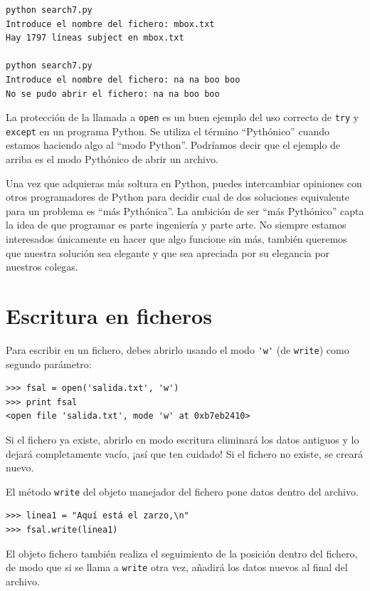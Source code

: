 \beforeverb
\begin{verbatim}
python search7.py
Introduce el nombre del fichero: mbox.txt
Hay 1797 líneas subject en mbox.txt

python search7.py
Introduce el nombre del fichero: na na boo boo
No se pudo abrir el fichero: na na boo boo
\end{verbatim}
\afterverb
%
La protección de la llamada a {\tt open} es un buen ejemplo
del uso correcto de {\tt try}
y {\tt except} en un programa Python. Se utiliza el término
``Pythónico'' cuando estamos haciendo algo al ``modo
Python''. Podríamos decir que el ejemplo de arriba es
el modo Pythónico de abrir un archivo.

Una vez que adquieras más soltura en Python, puedes intercambiar
opiniones con otros programadores de Python para decidir
cual de dos soluciones equivalente para un problema es
``más Pythónica''. La ambición de ser ``más Pythónico''
capta la idea de que programar es parte ingeniería
y parte arte. No siempre estamos interesados únicamente
en hacer que algo funcione sin más, también queremos que nuestra solución
sea elegante y que sea apreciada por su elegancia
por nuestros colegas.


\section{Escritura en ficheros}


Para escribir en un fichero, debes abrirlo usando el modo
\verb"'w'" (de {\tt write}) como segundo parámetro:

\beforeverb
\begin{verbatim}
>>> fsal = open('salida.txt', 'w')
>>> print fsal
<open file 'salida.txt', mode 'w' at 0xb7eb2410>
\end{verbatim}
\afterverb
%
Si el fichero ya existe, abrirlo en modo escritura eliminará
los datos antiguos y lo dejará completamente vacío, ¡así que ten cuidado!
Si el fichero no existe, se creará nuevo.

El método {\tt write} del objeto manejador del fichero
pone datos dentro del archivo.

\beforeverb
\begin{verbatim}
>>> linea1 = "Aquí está el zarzo,\n"
>>> fsal.write(linea1)
\end{verbatim}
\afterverb
%
El objeto fichero también realiza el seguimiento de la posición dentro del fichero, de modo
que si se llama a {\tt write} otra vez, añadirá los datos nuevos al final del archivo.

